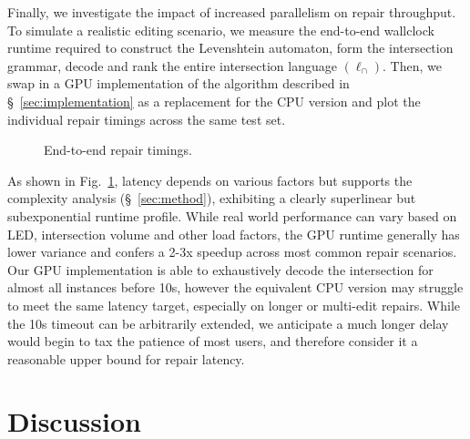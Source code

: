\documentclass[sigplan,review,acmsmall,nonacm,screen,anonymous]{acmart}\settopmatter{printfolios=false,printccs=false,printacmref=false}
\begin{document}

Finally, we investigate the impact of increased parallelism on repair throughput. To simulate a realistic editing scenario, we measure the end-to-end wallclock runtime required to construct the Levenshtein automaton, form the intersection grammar, decode and rank the entire intersection language $(\ell_\cap)$. Then, we swap in a GPU implementation of the algorithm described in \S~\ref{sec:implementation} as a replacement for the CPU version and plot the individual repair timings across the same test set.
\begin{figure}
\vspace{-0.2cm}
\resizebox{.38\textwidth}{!}{}
\vspace{-0.7cm}
\caption{End-to-end repair timings.}
\label{fig:timings}
\vspace{-0.3cm}
\end{figure}

\noindent As shown in Fig.~\ref{fig:timings}, latency depends on various factors but supports the complexity analysis (\S~\ref{sec:method}), exhibiting a clearly superlinear but subexponential runtime profile. While real world performance can vary based on LED, intersection volume and other load factors, the GPU runtime generally has lower variance and confers a 2-3x speedup across most common repair scenarios. Our GPU implementation is able to exhaustively decode the intersection for almost all instances before 10s, however the equivalent CPU version may struggle to meet the same latency target, especially on longer or multi-edit repairs. While the 10s timeout can be arbitrarily extended, we anticipate a much longer delay would begin to tax the patience of most users, and therefore consider it a reasonable upper bound for repair latency.

\clearpage\section{Discussion}\label{sec:discussion}
\end{document}
